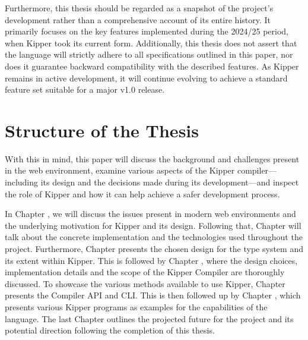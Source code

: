 Furthermore, this thesis should be regarded as a snapshot of the project's development rather than a comprehensive account of its entire history. It primarily focuses on the key features implemented during the 2024/25 period, when Kipper took its current form. Additionally, this thesis does not assert that the language will strictly adhere to all specifications outlined in this paper, nor does it guarantee backward compatibility with the described features. As Kipper remains in active development, it will continue evolving to achieve a standard feature set suitable for a major v1.0 release.

\section{Structure of the Thesis}

With this in mind, this paper will discuss the background and challenges present in the web environment, examine various aspects of the Kipper compiler—including its design and the decisions made during its development—and inspect the role of Kipper and how it can help achieve a safer development process.

In Chapter , we will discuss the issues present in modern web environments and the underlying motivation for Kipper and its design. Following that, Chapter  will talk about the concrete implementation and the technologies used throughout the project. Furthermore, Chapter  presents the chosen design for the type system and its extent within Kipper. This is followed by Chapter , where the design choices, implementation details and the scope of the Kipper Compiler are thoroughly discussed. To showcase the various methods available to use Kipper, Chapter  presents the Compiler API and CLI. This is then followed up by Chapter , which presents various Kipper programs as examples for the capabilities of the language. The last Chapter  outlines the projected future for the project and its potential direction following the completion of this thesis.

